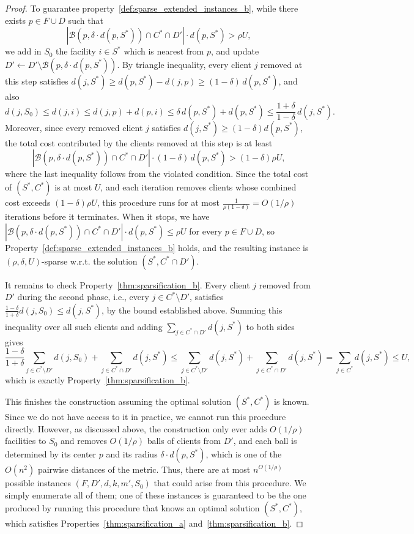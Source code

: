 \begin{proof}
    To guarantee property~\ref{def:sparse_extended_instances_b}, while there exists $p \in F \cup D$ such that
    \[
    |\mathcal{B}(p, \delta \cdot d(p, S^*)) \cap C^* \cap D'| \cdot d(p, S^*) > \rho U,
    \]
    we add in $S_0$ the facility $i \in S^*$ which is nearest from $p$, and update ${D' \gets D' \setminus \mathcal{B}(p, \delta \cdot d(p,S^*))}$. By triangle inequality, every client $j$ removed at this step satisfies $d(j,S^*) \ge d(p,S^*) - d(j,p) \ge (1-\delta)\, d(p,S^*)$, and also
    \[
    d(j,S_0) \le d(j,i) \le d(j,p) + d(p,i) \le \delta\, d(p,S^*) + d(p,S^*) \le \frac{1+\delta}{1-\delta}\, d(j,S^*).
    \]
    Moreover, since every removed client $j$ satisfies $d(j,S^*) \ge (1-\delta)d(p,S^*)$, the total cost contributed by the clients removed at this step is at least
    \[
    |\mathcal{B}(p,\delta \cdot d(p,S^*)) \cap C^* \cap D'| \cdot (1-\delta)\, d(p,S^*) > (1-\delta)\rho U,
    \]
    where the last inequality follows from the violated condition. Since the total cost of $(S^*,C^*)$ is at most $U$, and each iteration removes clients whose combined cost exceeds $(1-\delta)\rho U$, this procedure runs for at most $\frac{1}{\rho(1-\delta)} = O(1/\rho)$ iterations before it terminates. When it stops, we have $|\mathcal{B}(p,\delta\cdot d(p,S^*)) \cap C^* \cap D'|\cdot d(p,S^*) \le \rho U$ for every $p\in F\cup D$, so Property~\ref{def:sparse_extended_instances_b} holds, and the resulting instance is $(\rho, \delta, U)$-sparse w.r.t. the solution $(S^*,C^*\cap D')$.

    It remains to check Property~\ref{thm:sparsification_b}. Every client $j$ removed from $D'$ during the second phase, i.e., every $j \in C^*\setminus D'$, satisfies $\frac{1-\delta}{1+\delta}d(j,S_0) \le d(j,S^*)$, by the bound established above. Summing this inequality over all such clients and adding $\sum_{j\in C^*\cap D'} d(j,S^*)$ to both sides gives
    \[
    \frac{1-\delta}{1+\delta}\sum_{j\in C^*\setminus D'} d(j,S_0) + \sum_{j\in C^*\cap D'} d(j,S^*) \le \sum_{j\in C^*\setminus D'} d(j,S^*) + \sum_{j\in C^*\cap D'} d(j,S^*) = \sum_{j\in C^*} d(j,S^*) \le U,
    \]
    which is exactly Property~\ref{thm:sparsification_b}.

    This finishes the construction assuming the optimal solution $(S^*,C^*)$ is known. Since we do not have access to it in practice, we cannot run this procedure directly. However, as discussed above, the construction only ever adds $O(1/\rho)$ facilities to $S_0$ and removes $O(1/\rho)$ balls of clients from $D'$, and each ball is determined by its center $p$ and its radius $\delta \cdot d(p,S^*)$, which is one of the $O(n^2)$ pairwise distances of the metric. Thus, there are at most $n^{O(1/\rho)}$ possible instances $(F,D',d,k,m',S_0)$ that could arise from this procedure. We simply enumerate all of them; one of these instances is guaranteed to be the one produced by running this procedure that knows an optimal solution $(S^*,C^*)$, which satisfies Properties~\ref{thm:sparsification_a} and~\ref{thm:sparsification_b}.
\end{proof}

